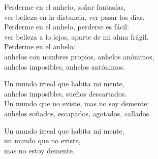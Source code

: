 \begin{lyrics}
Perderme en el anhelo, soñar fantasías,\\
ver belleza en la distancia, ver pasar los días.\\
Perderme en el anhelo, perderse es fácil:\\
ver belleza a lo lejos, aparte de mi alma frágil.\\
Perderme en el anhelo:\\
anhelos con nombres propios, anhelos anónimos,\\
anhelos imposibles, anhelos antónimos.

Un mundo irreal que habita mi mente,\\
anhelos imposibles, sueños descartados.\\
Un mundo que no existe, mas no soy demente;\\
anhelos soñados, escapados, agotados, callados.

Un mundo irreal que habita mi mente,\\
un mundo que no existe,\\
mas no estoy demente.
\end{lyrics}


